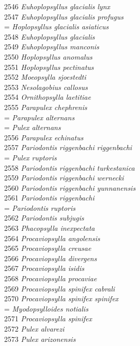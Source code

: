\documentclass[
]{article}
\begin{document}
2546 \emph{Euhoplopsyllus glacialis lynx}\\
2547 \emph{Euhoplopsyllus glacialis profugus}\\
= \emph{Hoplopsyllus glacialis asiaticus}\\
2548 \emph{Euhoplopsyllus glacialis}\\
2549 \emph{Euhoplopsyllus manconis}\\
2550 \emph{Hoplopsyllus anomalus}\\
2551 \emph{Hoplopsyllus pectinatus}\\
2552 \emph{Moeopsylla sjoestedti}\\
2553 \emph{Nesolagobius callosus}\\
2554 \emph{Ornithopsylla laetitiae}\\
2555 \emph{Parapulex chephrenis}\\
= \emph{Parapulex alternans}\\
= \emph{Pulex alternans}\\
2556 \emph{Parapulex echinatus}\\
2557 \emph{Pariodontis riggenbachi riggenbachi}\\
= \emph{Pulex ruptoris}\\
2558 \emph{Pariodontis riggenbachi turkestanica}\\
2559 \emph{Pariodontis riggenbachi wernecki}\\
2560 \emph{Pariodontis riggenbachi yunnanensis}\\
2561 \emph{Pariodontis riggenbachi}\\
= \emph{Pariodontis ruptoris}\\
2562 \emph{Pariodontis subjugis}\\
2563 \emph{Phacopsylla inexpectata}\\
2564 \emph{Procaviopsylla angolensis}\\
2565 \emph{Procaviopsylla creusae}\\
2566 \emph{Procaviopsylla divergens}\\
2567 \emph{Procaviopsylla isidis}\\
2568 \emph{Procaviopsylla procaviae}\\
2569 \emph{Procaviopsylla spinifex cabrali}\\
2570 \emph{Procaviopsylla spinifex spinifex}\\
= \emph{Myodopsylloides notialis}\\
2571 \emph{Procaviopsylla spinifex}\\
2572 \emph{Pulex alvarezi}\\
2573 \emph{Pulex arizonensis}\\
\end{document}
